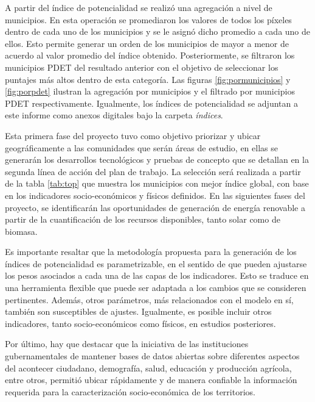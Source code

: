 A partir del índice de potencialidad se realizó una agregación a nivel de municipios.  En esta operación se promediaron los valores de todos los píxeles 
dentro de cada uno de los municipios y se le asignó dicho promedio a cada uno de ellos.  Esto permite generar un orden de los municipios de mayor a menor de 
acuerdo al valor promedio del índice obtenido.  Posteriormente, se filtraron los municipios PDET del resultado anterior con el objetivo de seleccionar los 
puntajes más altos dentro de esta categoría.  Las figuras \ref{fig:pormunicipios} y \ref{fig:porpdet} ilustran la agregación por municipios y el filtrado por 
municipios PDET respectivamente.  Igualmente, los índices de potencialidad se adjuntan a este informe como anexos digitales bajo la carpeta \textit{índices}.

Esta primera fase del proyecto tuvo como objetivo priorizar y ubicar geográficamente a las comunidades que serán áreas de estudio, en ellas se generarán los
desarrollos tecnológicos y pruebas de concepto que se detallan en la segunda línea de acción del plan de trabajo. La selección será realizada a partir de la
tabla \ref{tab:top} que muestra los municipios con mejor índice global, con base en los indicadores socio-económicos y físicos definidos. En las siguientes 
fases del proyecto, se identificarán las oportunidades de generación de energía renovable a partir de la cuantificación de los recursos disponibles, tanto solar 
como de biomasa.

Es importante resaltar que la metodología propuesta para la generación de los índices de potencialidad es parametrizable, en el sentido de que pueden ajustarse
los pesos asociados a cada una de las capas de los indicadores. Esto se traduce en una herramienta flexible que puede ser adaptada a los cambios que se
consideren pertinentes. Además, otros parámetros, más relacionados con el modelo en sí, también son susceptibles de ajustes. Igualmente, es posible incluir
otros indicadores, tanto socio-económicos como físicos, en estudios posteriores.

Por último, hay que destacar que la iniciativa de las instituciones gubernamentales de mantener bases de datos abiertas sobre diferentes aspectos del acontecer
ciudadano, demografía, salud, educación y producción agrícola, entre otros, permitió ubicar rápidamente y de manera confiable la información requerida para la
caracterización socio-económica de los territorios.


